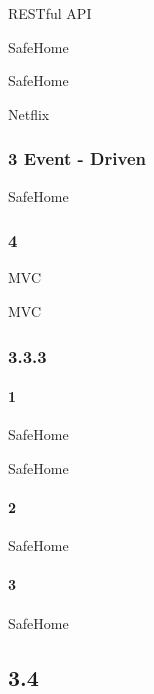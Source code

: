 
RESTful API

SafeHome


SafeHome


Netflix

\hypertarget{event---driven}{%
\subsubsection{3 Event - Driven}\label{event---driven}}


SafeHome



\hypertarget{section-30}{%
\subsubsection{4}\label{section-30}}

MVC

MVC

\hypertarget{section-31}{%
\subsubsection{3.3.3}\label{section-31}}

\hypertarget{section-32}{%
\paragraph{1}\label{section-32}}

SafeHome

SafeHome

\hypertarget{section-33}{%
\paragraph{2}\label{section-33}}

SafeHome

\hypertarget{section-34}{%
\paragraph{3}\label{section-34}}

SafeHome

\hypertarget{section-35}{%
\subsection{3.4}\label{section-35}}

